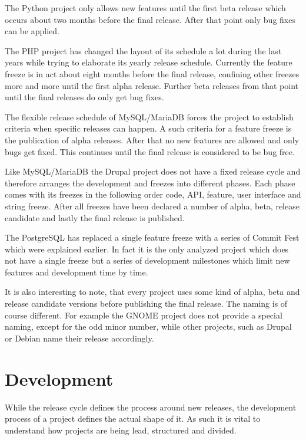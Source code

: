 The Python project only allows new features until the first beta release which
occurs about two months before the final release. After that point only bug
fixes can be applied.

The PHP project has changed the layout of its schedule a lot during the last
years while trying to elaborate its yearly release schedule. Currently the
feature freeze is in act about eight months before the final release, confining
other freezes more and more until the first alpha release. Further beta
releases from that point until the final releases do only get bug fixes.

The flexible release schedule of MySQL/MariaDB forces the project to establish
criteria when specific releases can happen. A such criteria for a feature
freeze is the publication of alpha releases. After that no new features are
allowed and only bugs get fixed. This continues until the final release is
considered to be bug free.

Like MySQL/MariaDB the Drupal project does not have a fixed release cycle and
therefore arranges the development and freezes into different phases. Each
phase comes with its freezes in the following order code, \ac{API}, feature,
user interface and string freeze. After all freezes have been declared a number
of alpha, beta, release candidate and lastly the final release is published.

The PostgreSQL has replaced a single feature freeze with a series of Commit
Fest which were explained earlier. In fact it is the only analyzed project
which does not have a single freeze but a series of development milestones
which limit new features and development time by time.

It is also interesting to note, that every project uses some kind of alpha,
beta and release candidate versions before publishing the final release. The
naming is of course different. For example the GNOME project does not provide a
special naming, except for the odd minor number, while other projects, such as
Drupal or Debian name their release accordingly.



\section{Development} %

While the release cycle defines the process around new releases, the
development process of a project defines the actual shape of it. As such it is
vital to understand how projects are being lead, structured and divided.

